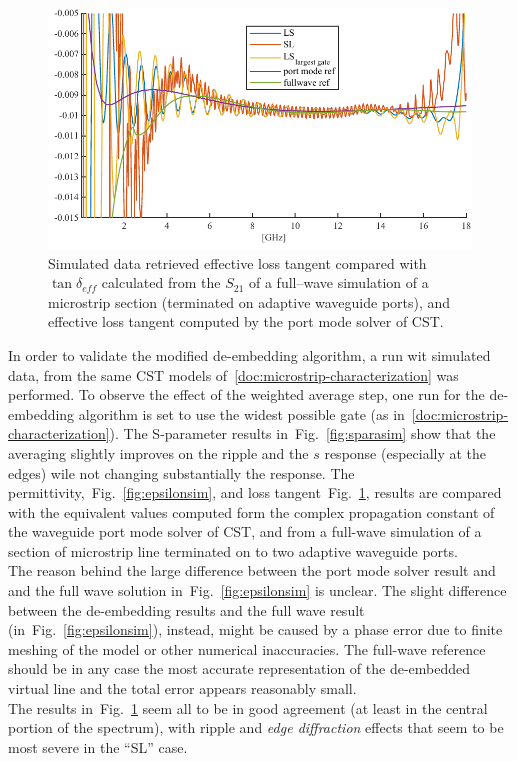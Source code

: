 \documentclass[11pt,a4paper]{article}
\newcommand{\fig}[1]{Fig.~\ref{#1}}
\newcommand{\laser}[1]{``#1''}
\begin{document}
    \begin{figure}[!tb]
        \includegraphics[width=\textwidth]{tandsim}
        \caption{Simulated data retrieved effective loss tangent compared with $\tan\delta_{eff}$ calculated from
        the $S_{21}$ of a full--wave simulation of a microstrip section (terminated on adaptive waveguide ports),
            and effective loss tangent computed by the port mode solver of CST.}
        \label{fig:tandsim}
    \end{figure}
    In order to validate the modified de-embedding algorithm, a run wit simulated data, from the same CST models
    of~\ref{doc:microstrip-characterization} was performed.
    To observe the effect of the weighted average step, one run for the de-embedding algorithm is set to use the widest
    possible gate (as in~\ref{doc:microstrip-characterization}).
    The S-parameter results in~\fig{fig:sparasim} show that the averaging slightly improves on the ripple and the $s$
    response (especially at the edges) wile not changing substantially the response.
    The permittivity,~\fig{fig:epsilonsim}, and loss tangent~\fig{fig:tandsim}, results are compared with the
    equivalent values computed form the complex propagation constant of the waveguide port mode solver of CST, and
    from a full-wave simulation of a section of microstrip line terminated on to two adaptive waveguide ports.\\
    The reason behind the large difference between the port mode solver result and and the full wave solution in~\fig{fig:epsilonsim}
    is unclear.
    The slight difference between the de-embedding results and the full wave result (in~\fig{fig:epsilonsim}), instead,
    might be caused by a phase error due to finite meshing of the model or other numerical inaccuracies.
    The full-wave reference should be in any case the most accurate representation of the de-embedded virtual line and the
    total error appears reasonably small.\\
    The results in~\fig{fig:tandsim} seem all to be in good agreement (at least in the central portion of the spectrum),
    with ripple and \emph{edge diffraction} effects that seem to be most severe in the \laser{SL} case.
\end{document}
